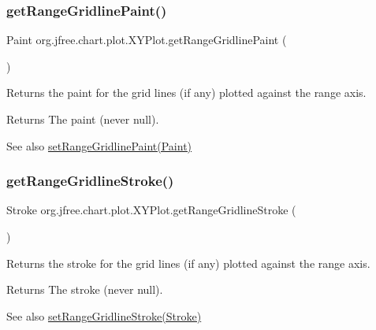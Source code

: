\subsubsection{\texorpdfstring{get\+Range\+Gridline\+Paint()}{getRangeGridlinePaint()}}
{\footnotesize\ttfamily Paint org.\+jfree.\+chart.\+plot.\+X\+Y\+Plot.\+get\+Range\+Gridline\+Paint (\begin{DoxyParamCaption}{ }\end{DoxyParamCaption})}

Returns the paint for the grid lines (if any) plotted against the range axis.

\begin{DoxyReturn}{Returns}
The paint (never {\ttfamily null}).
\end{DoxyReturn}
\begin{DoxySeeAlso}{See also}
\mbox{\hyperlink{classorg_1_1jfree_1_1chart_1_1plot_1_1_x_y_plot_a18ad3cf0c12818de2620718ec02a7532}{set\+Range\+Gridline\+Paint(\+Paint)}} 
\end{DoxySeeAlso}
\mbox{\label{classorg_1_1jfree_1_1chart_1_1plot_1_1_x_y_plot_a4d382725d310ef5f421a94fbd8409e70}} 
\subsubsection{\texorpdfstring{get\+Range\+Gridline\+Stroke()}{getRangeGridlineStroke()}}
{\footnotesize\ttfamily Stroke org.\+jfree.\+chart.\+plot.\+X\+Y\+Plot.\+get\+Range\+Gridline\+Stroke (\begin{DoxyParamCaption}{ }\end{DoxyParamCaption})}

Returns the stroke for the grid lines (if any) plotted against the range axis.

\begin{DoxyReturn}{Returns}
The stroke (never {\ttfamily null}).
\end{DoxyReturn}
\begin{DoxySeeAlso}{See also}
\mbox{\hyperlink{classorg_1_1jfree_1_1chart_1_1plot_1_1_x_y_plot_a4356ce9b7c42e0d4b6b5dd7d671b0ac3}{set\+Range\+Gridline\+Stroke(\+Stroke)}} 
\end{DoxySeeAlso}
\mbox{\label{classorg_1_1jfree_1_1chart_1_1plot_1_1_x_y_plot_a7790ee08681555eedbc7b54c9deddb27}} 
